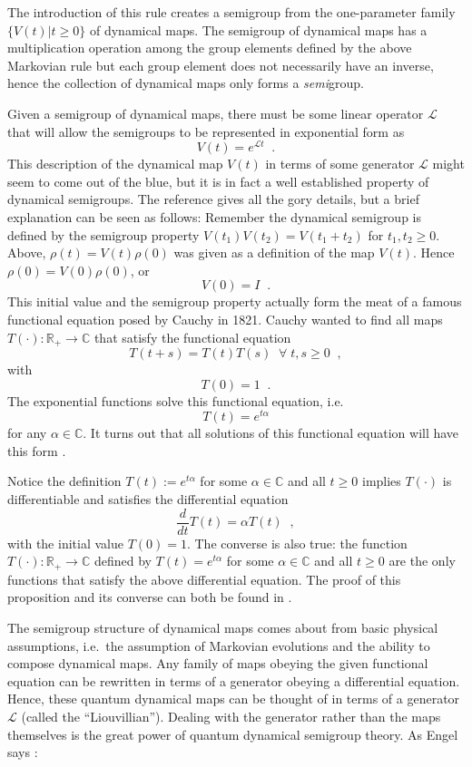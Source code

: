 The introduction of this rule creates a semigroup from the one-parameter family $\{V(t)|t\ge0\}$ of dynamical maps.  The semigroup of dynamical maps has a multiplication operation among the group elements defined by the above Markovian rule but each group element does not necessarily have an inverse, hence the collection of dynamical maps only forms a {\it semi}group.

Given a semigroup of dynamical maps, there must be some linear operator $\mathcal{L}$ that will allow the semigroups to be represented in exponential form as
$$
V(t) = e^{\mathcal{L}t}\;\;.
$$
This description of the dynamical map $V(t)$ in terms of some generator $\mathcal{L}$ might seem to come out of the blue, but it is in fact a well established property of dynamical semigroups.  The reference \cite{Engel1999} gives all the gory details, but a brief explanation can be seen as follows:  Remember the dynamical semigroup is defined by the semigroup property $V(t_1)V(t_2) = V(t_1+t_2)$ for $t_1,t_2\ge0$.  Above, $\rho(t) = V(t)\rho(0)$ was given as a definition of the map $V(t)$.  Hence $\rho(0)=V(0)\rho(0)$, or
$$
V(0) = I\;\;.
$$
This initial value and the semigroup property actually form the meat of a famous functional equation posed by Cauchy in 1821.  Cauchy wanted to find all maps $T(\cdot): \mathbb{R}_+\rightarrow \mathbb{C}$ that satisfy the functional equation
$$
T(t+s) = T(t)T(s)\;\;\forall\; t,s \ge 0\;\;,
$$
with
$$
T(0) = 1\;\;.
$$
The exponential functions solve this functional equation, i.e.
$$
T(t) = e^{t\alpha}
$$
for any $\alpha\in \mathbb{C}$.  It turns out that all solutions of this functional equation will have this form \cite{Engel1999}.  

Notice the definition $T(t) := e^{t\alpha}$ for some $\alpha \in \mathbb{C}$ and all $t\ge 0$ implies $T(\cdot)$ is differentiable and satisfies the differential equation
$$
\frac{ d }{dt} T(t) = \alpha T(t)\;\;,
$$
with the initial value $T(0) = 1$.  The converse is also true: the function $T(\cdot): \mathbb{R}_+\rightarrow \mathbb{C}$ defined by $T(t) = e^{t\alpha}$ for some $\alpha \in \mathbb{C}$ and all $t\ge 0$ are the only functions that satisfy the above differential equation.  The proof of this proposition and its converse can both be found in \cite{Engel1999}.  

The semigroup structure of dynamical maps comes about from basic physical assumptions, i.e.\ the assumption of Markovian evolutions and the ability to compose dynamical maps.  Any family of maps obeying the given functional equation can be rewritten in terms of a generator obeying a differential equation.  Hence, these quantum dynamical maps can be thought of in terms of a generator $\mathcal{L}$ (called the ``Liouvillian'').  Dealing with the generator rather than the maps themselves is the great power of quantum dynamical semigroup theory.  As Engel says \cite{Engel1999}:

